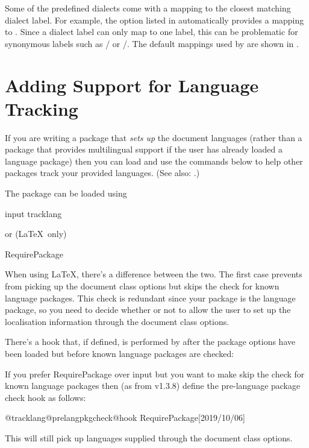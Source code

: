\documentclass[titlepage=false,oneside,
 fontsize=12pt,captions=tableheading]{scrbook}
\begin{document}
Some of the predefined  dialects come with
a mapping to the closest matching  dialect label.
For example, the option  listed in
 automatically provides a mapping
to . Since a  dialect label 
can only map to one  label, this can be problematic
for synonymous labels such as
\slash{} or
\slash{}. The default mappings used
by  are shown in .

\chapter{Adding Support for Language Tracking}
\label{sec:langsty}

If you are writing a package that \emph{sets up} the document languages (rather
than a package that provides multilingual support if the user has
already loaded a language package) then you can load 
and use the commands below to help other packages track your
provided languages. (See also:
.)

The  package can be loaded using
\begin{codebox}
\gls{input} tracklang
\end{codebox}
or (\LaTeX\ only)
\begin{codebox}
\gls{RequirePackage}
\end{codebox}

When using \LaTeX, there's a difference between the two.
The first case prevents  from picking up
the document class options but skips the check for known
language packages. This check is redundant since your package is
the language package, so you need to decide whether or
not to allow the user to set up the localisation information
through the document class options.

There's a hook that, if defined, is performed by
 after the package options have been loaded but
before known language packages are checked:

If you prefer \gls{RequirePackage} over \gls{input} but you want to make 
 skip the check for known
language packages then (as from v1.3.8) define the pre-language
package check hook as follows:
\begin{codebox}
\gls{@tracklang@prelangpkgcheck@hook}
\gls{RequirePackage}[2019/10/06]
\end{codebox}
This will still pick up languages supplied through the
document class options.
\end{document}
